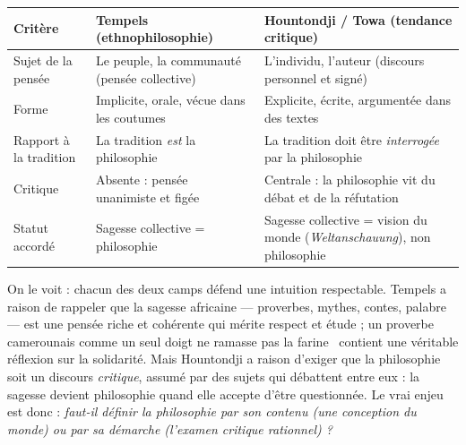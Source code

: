 \documentclass[11pt]{article}
\begin{document}
\begin{center}
\begin{tabularx}{\linewidth}{|l|X|X|}
\hline
\rowcolor{popblueL} \textbf{Critère} & \textbf{Tempels (ethnophilosophie)} & \textbf{Hountondji / Towa (tendance critique)} \\
\hline
Sujet de la pensée & Le peuple, la communauté (pensée collective) & L'individu, l'auteur (discours personnel et signé) \\
\hline
Forme & Implicite, orale, vécue dans les coutumes & Explicite, écrite, argumentée dans des textes \\
\hline
Rapport à la tradition & La tradition \emph{est} la philosophie & La tradition doit être \emph{interrogée} par la philosophie \\
\hline
Critique & Absente : pensée unanimiste et figée & Centrale : la philosophie vit du débat et de la réfutation \\
\hline
Statut accordé & Sagesse collective = philosophie & Sagesse collective = vision du monde (\emph{Weltanschauung}), non philosophie \\
\hline
\end{tabularx}
\end{center}

On le voit : chacun des deux camps défend une intuition respectable. Tempels a raison de rappeler que la sagesse africaine — proverbes, mythes, contes, palabre — est une pensée riche et cohérente qui mérite respect et étude ; un proverbe camerounais comme \guillemotleft un seul doigt ne ramasse pas la farine \guillemotright\ contient une véritable réflexion sur la solidarité. Mais Hountondji a raison d'exiger que la philosophie soit un discours \emph{critique}, assumé par des sujets qui débattent entre eux : la sagesse devient philosophie quand elle accepte d'être questionnée. Le vrai enjeu est donc : \emph{faut-il définir la philosophie par son contenu (une conception du monde) ou par sa démarche (l'examen critique rationnel) ?}
\end{document}

